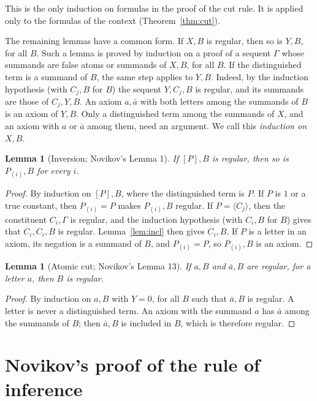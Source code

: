 \documentclass[11pt]{amsart}
\newtheorem{lemma}[theorem]{Lemma}
\theoremstyle{definition}
\theoremstyle{remark}
\newcommand{\seq}[1]{\langle #1\rangle}
\newcommand{\one}[1]{[#1]}
\begin{document}
This is the only induction on formulas in the proof of the cut rule. It
is applied only to the formulas of the context (Theorem~\ref{thm:cut}).

The remaining lemmas have a common form. If $X,B$ is regular, then so is
$Y,B$, for all $B$. Such a lemma is proved by induction on a proof of a
sequent $\Gamma$ whose summands are false atoms or summands of $X,B$, for all $B$.
If the distinguished term is a summand of $B$, the same step applies to
$Y,B$. Indeed, by the induction hypothesis (with $C_j,B$ for $B$) the
sequent $Y,C_j,B$ is regular, and its summands are those of $C_j,Y,B$.
An axiom $a,\bar a$ with both letters among the summands of $B$ is an axiom
of $Y,B$. Only a distinguished term among the summands of $X$, and an
axiom with $a$ or $\bar a$ among them, need an argument. We call this
\emph{induction on $X,B$}.

\begin{lemma}[Inversion; Novikov's Lemma 1]\label{lem:inv}
  If $\one{P},B$ is regular, then so is $P_{(i)},B$ for every $i$.
\end{lemma}

\begin{proof}
  By induction on $\one{P},B$, where the distinguished term is $P$. If $P$
  is $1$ or a true constant, then $P_{(i)}=P$ makes $P_{(i)},B$ regular. If
  $P=\seq{C_j}$, then the constituent $C_i,\Gamma$ is regular, and the
  induction hypothesis (with $C_i,B$ for $B$) gives that $C_i,C_i,B$ is
  regular. Lemma~\ref{lem:incl} then gives $C_i,B$. If $P$ is a letter in
  an axiom, its negation is a summand of $B$, and $P_{(i)}=P$, so
  $P_{(i)},B$ is an axiom.
\end{proof}

\begin{lemma}[Atomic cut; Novikov's Lemma 13]\label{lem:atom}
  If $a,B$ and $\bar a,B$ are regular, for a letter $a$, then $B$ is
  regular.
\end{lemma}

\begin{proof}
  By induction on $a,B$ with $Y=0$, for all $B$ such that $\bar a,B$ is
  regular. A letter is never a distinguished term. An axiom with the
  summand $a$ has $\bar a$ among the summands of $B$; then $\bar a,B$ is
  included in $B$, which is therefore regular.
\end{proof}

\section{Novikov's proof of the rule of inference}\label{sec:novikov}
\end{document}
